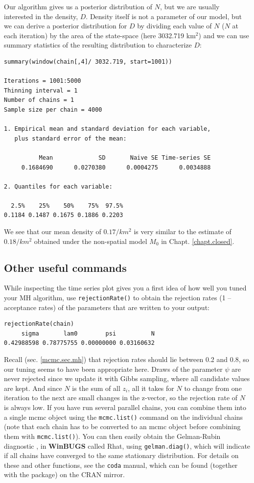 Our algorithm gives us a posterior distribution of $N$, but we are usually 
interested in the density, $D$. Density itself is not a parameter of our 
model, but we can derive a posterior distribution for $D$ by dividing 
each value of $N$ ($N$ at each iteration) by the area of the state-space
 (here 3032.719 km$^2$) and we can use summary statistics of the 
 resulting distribution to characterize $D$:
\begin{verbatim}
summary(window(chain[,4]/ 3032.719, start=1001))

Iterations = 1001:5000
Thinning interval = 1 
Number of chains = 1 
Sample size per chain = 4000 

1. Empirical mean and standard deviation for each variable,
   plus standard error of the mean:

          Mean             SD       Naive SE Time-series SE 
     0.1684690      0.0270380      0.0004275      0.0034888 

2. Quantiles for each variable:

  2.5%    25%    50%    75%  97.5% 
0.1184 0.1487 0.1675 0.1886 0.2203 
\end{verbatim}
We see that our mean density of $0.17/km^2$ is very similar to the estimate of $0.18/km^2$ obtained under the non-spatial model $M_0$ in Chapt. \ref{chapt.closed}.


\subsection{Other useful commands }
While inspecting the time series plot gives you a first idea of how well you tuned your MH algorithm, use \verb#rejectionRate()# to obtain the rejection rates (1 -- acceptance rates) of the parameters that are written to your output:
\begin{verbatim}
rejectionRate(chain)
     sigma       lam0        psi          N 
0.42988598 0.78775755 0.00000000 0.03160632 
\end{verbatim}
 Recall (sec. \ref{mcmc.sec.mh}) that rejection rates should lie between 0.2 and 0.8, so our tuning seems to have been appropriate here. Draws of the parameter $\psi$ are never rejected since we update it with Gibbs sampling, where all candidate values are kept. And since $N$ is the sum of all $z_i$, all it takes for $N$ to change from one iteration to the next are small changes in the z-vector, so the rejection rate of $N$ is always low.
If you have run several parallel chains, you can combine them into a single mcmc object using the \verb#mcmc.list()# command on the individual chains (note that each chain has to be converted to an mcmc object before combining them with \verb#mcmc.list()#). You can then easily obtain the Gelman-Rubin diagnostic \citep{gelman_etal:2004}, in {\bf WinBUGS} called Rhat, using \verb#gelman.diag()#, which 
will indicate if all chains have converged to the same stationary distribution.
For details on these and other functions, see the \mbox{\tt coda} manual, 
which can be found (together with the package) on the CRAN mirror.

